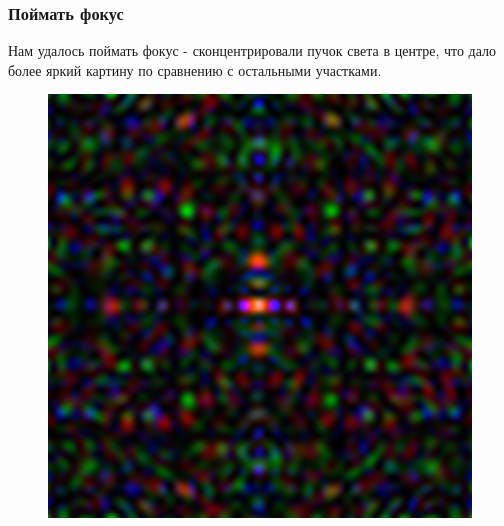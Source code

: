 \documentclass{beamer}
\begin{document}
\begin{frame}
  \frametitle{Поймать фокус}

  Нам удалось поймать фокус - сконцентрировали пучок света в центре, что дало более яркий картину по сравнению с остальными участками.

  \begin{figure}[c]
    \includegraphics[scale=0.3]{assets/len3.png}
  \end{figure}
\end{frame}
\end{document}
